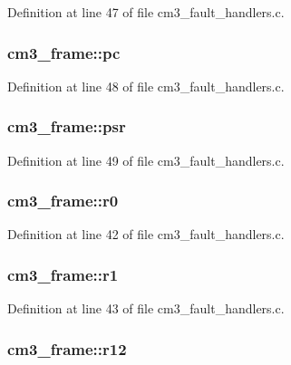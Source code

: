 Definition at line 47 of file cm3\-\_\-fault\-\_\-handlers.\-c.

\hypertarget{structcm3__frame_a2592e72a1b369dbe1297c6e313ffb769}{
\subsubsection[{pc}]{ cm3\-\_\-frame\-::pc}}\label{structcm3__frame_a2592e72a1b369dbe1297c6e313ffb769}


Definition at line 48 of file cm3\-\_\-fault\-\_\-handlers.\-c.

\hypertarget{structcm3__frame_a72f11d5d0eaff3a7684af9aa42531738}{
\subsubsection[{psr}]{ cm3\-\_\-frame\-::psr}}\label{structcm3__frame_a72f11d5d0eaff3a7684af9aa42531738}


Definition at line 49 of file cm3\-\_\-fault\-\_\-handlers.\-c.

\hypertarget{structcm3__frame_a183f1c71c82446beaa80b9aaefe31650}{
\subsubsection[{r0}]{ cm3\-\_\-frame\-::r0}}\label{structcm3__frame_a183f1c71c82446beaa80b9aaefe31650}


Definition at line 42 of file cm3\-\_\-fault\-\_\-handlers.\-c.

\hypertarget{structcm3__frame_ac9b99b04d32c6f516cbea10105bf7186}{
\subsubsection[{r1}]{ cm3\-\_\-frame\-::r1}}\label{structcm3__frame_ac9b99b04d32c6f516cbea10105bf7186}


Definition at line 43 of file cm3\-\_\-fault\-\_\-handlers.\-c.

\hypertarget{structcm3__frame_a58e30011b89d86345e64966b61fdce95}{
\subsubsection[{r12}]{ cm3\-\_\-frame\-::r12}}\label{structcm3__frame_a58e30011b89d86345e64966b61fdce95}


